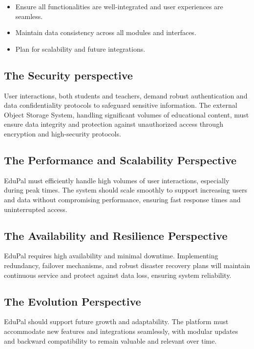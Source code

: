 \begin{itemize}
    \item Ensure all functionalities are well-integrated and user experiences are seamless.
    \item Maintain data consistency across all modules and interfaces.
    \item Plan for scalability and future integrations.
\end{itemize}


\subsection{The Security perspective}

User interactions, both students and teachers, demand robust authentication and data confidentiality protocols to safeguard sensitive information. The external Object Storage System, handling significant volumes of educational content, must ensure data integrity and protection against unauthorized access through encryption and high-security protocols.


\subsection{The Performance and Scalability Perspective}

EduPal must efficiently handle high volumes of user interactions, especially during peak times. The system should scale smoothly to support increasing users and data without compromising performance, ensuring fast response times and uninterrupted access.


\subsection{The Availability and Resilience Perspective}

EduPal requires high availability and minimal downtime. Implementing redundancy, failover mechanisms, and robust disaster recovery plans will maintain continuous service and protect against data loss, ensuring system reliability.


\subsection{The Evolution Perspective}

EduPal should support future growth and adaptability. The platform must accommodate new features and integrations seamlessly, with modular updates and backward compatibility to remain valuable and relevant over time.


